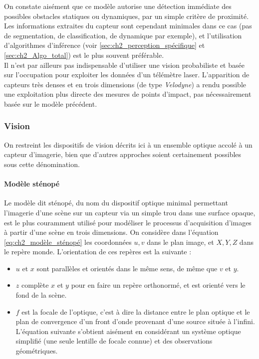 On constate aisément que ce modèle autorise une détection immédiate des possibles obstacles statiques ou dynamiques, par un simple critère de proximité. Les informations extraites du capteur sont cependant minimales dans ce cas (pas de segmentation, de classification, de dynamique par exemple), et l'utilisation d'algorithmes d'inférence (voir \ref{sec:ch2_perception_spécifique} et \ref{sec:ch2_Algo_total}) est le plus souvent préférable. \\

Il n'est par ailleurs pas indispensable d'utiliser une vision probabiliste et basée sur l'occupation pour exploiter les données d'un télémètre laser. L'apparition de capteurs très denses et en trois dimensions (de type \textit{Velodyne}) a rendu possible une exploitation plus directe des mesures de points d'impact, pas nécessairement basée sur le modèle précédent.

\subsubsection{Vision}
On restreint les dispositifs de vision décrits ici à un ensemble optique accolé à un capteur d'imagerie, bien que d'autres approches soient certainement possibles sous cette dénomination. 

\paragraph{Modèle sténopé\\}
Le modèle dit \og sténopé\fg{}, du nom du dispositif optique minimal permettant l'imagerie d'une scène sur un capteur via un simple trou dans une surface opaque, est le plus couramment utilisé pour modéliser le processus d'acquisition d'images à partir d'une scène en trois dimensions. On considère dans l'équation \ref{eq:ch2_modèle_sténopé} les coordonnées ${u,v}$ dans le plan image, et ${X,Y,Z}$ dans le repère monde. L'orientation de ces repères est la suivante :
\begin{itemize}
	\item{} $u$ et $x$ sont parallèles et orientés dans le même sens, de même que $v$ et $y$.\\
	\item{} $z$ complète $x$ et $y$ pour en faire un repère orthonormé, et est orienté vers le fond de la scène.\\
	\item{}	$f$ est la focale de l'optique, c'est à dire la distance entre le plan optique et le plan de convergence d'un front d'onde provenant d'une source située à l'infini. L'équation suivante s'obtient aisément en considérant un système optique simplifié (une seule lentille de focale connue) et des observations géométriques.\\
\end{itemize}

